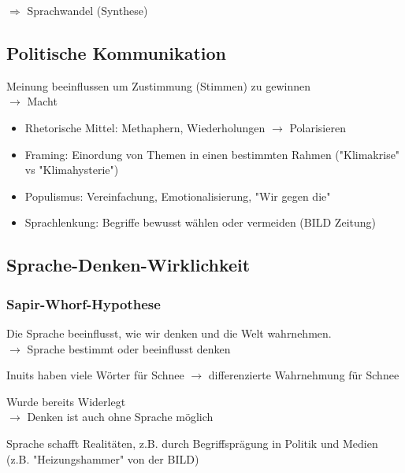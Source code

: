 $\Rightarrow$ Sprachwandel (Synthese)


\subsection{Politische Kommunikation}

Meinung beeinflussen um Zustimmung (Stimmen) zu gewinnen \\
$\rightarrow$ Macht

\begin{itemize}
    \item Rhetorische Mittel: Methaphern, Wiederholungen $\rightarrow$ Polarisieren
    \item Framing: Einordung von Themen in einen bestimmten Rahmen ("Klimakrise" vs "Klimahysterie")
    \item Populismus: Vereinfachung, Emotionalisierung, "Wir gegen die"
    \item Sprachlenkung: Begriffe bewusst wählen oder vermeiden (BILD Zeitung)
\end{itemize}


\subsection{Sprache-Denken-Wirklichkeit}

\subsubsection{Sapir-Whorf-Hypothese}

Die Sprache beeinflusst, wie wir denken und die Welt wahrnehmen. \\
$\rightarrow$ Sprache bestimmt oder beeinflusst denken

Inuits haben viele Wörter für Schnee $\rightarrow$ differenzierte Wahrnehmung für Schnee

Wurde bereits Widerlegt \\
$\rightarrow$ Denken ist auch ohne Sprache möglich

Sprache schafft Realitäten, z.B. durch Begriffsprägung in Politik und Medien (z.B. "Heizungshammer" von der BILD)


